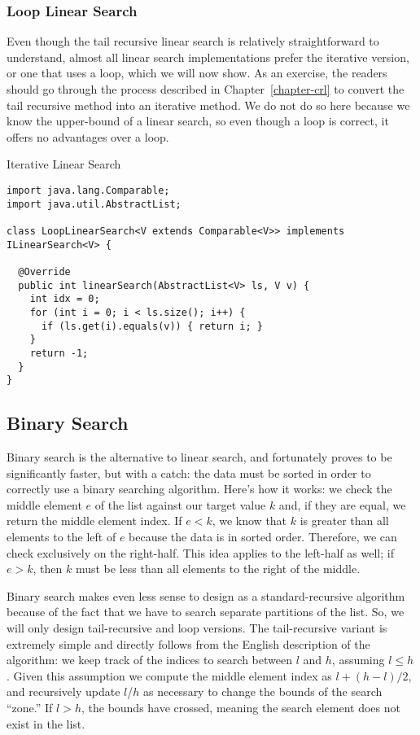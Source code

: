 \subsubsection*{Loop Linear Search}

Even though the tail recursive linear search is relatively straightforward to understand, almost all linear search implementations prefer the iterative version, or one that uses a loop, which we will now show. As an exercise, the readers should go through the process described in Chapter~\ref{chapter-crl} to convert the tail recursive method into an iterative method. We do not do so here because we know the upper-bound of a linear search, so even though a  loop is correct, it offers no advantages over a  loop.

\begin{cl}[]{Iterative Linear Search}
\begin{lstlisting}[language=MyJava]
import java.lang.Comparable;
import java.util.AbstractList;

class LoopLinearSearch<V extends Comparable<V>> implements ILinearSearch<V> {

  @Override
  public int linearSearch(AbstractList<V> ls, V v) {
    int idx = 0;
    for (int i = 0; i < ls.size(); i++) {
      if (ls.get(i).equals(v)) { return i; }
    }
    return -1;
  }
}
\end{lstlisting}
\end{cl}

\subsection{Binary Search}

Binary search is the alternative to linear search, and fortunately proves to be significantly faster, but with a catch: the data must be sorted in order to correctly use a binary searching algorithm. Here's how it works: we check the middle element $e$ of the list against our target value $k$ and, if they are equal, we return the middle element index. If $e < k$, we know that $k$ is greater than all elements to the left of $e$ because the data is in sorted order. Therefore, we can check exclusively on the right-half. This idea applies to the left-half as well; if $e > k$, then $k$ must be less than all elements to the right of the middle. 

Binary search makes even less sense to design as a standard-recursive algorithm because of the fact that we have to search separate partitions of the list. So, we will only design tail-recursive and loop versions. The tail-recursive variant is extremely simple and directly follows from the English description of the algorithm: we keep track of the indices to search between $l$ and $h$, assuming $l \leq h$. Given this assumption we compute the middle element index as $l + (h - l) / 2$, and recursively update $l$/$h$ as necessary to change the bounds of the search ``zone.'' If $l > h$, the bounds have crossed, meaning the search element does not exist in the list. 

